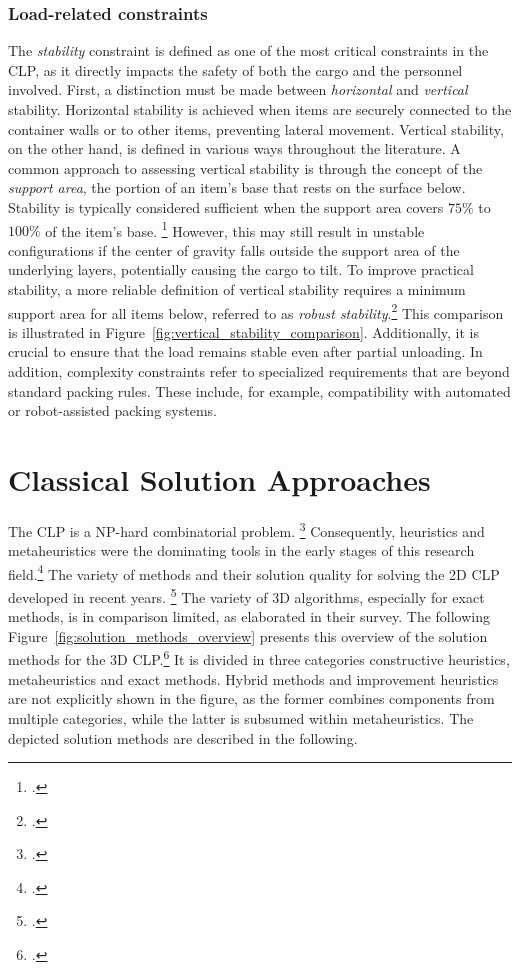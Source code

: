 \subsubsection{Load-related constraints}

The \textit{stability} constraint is defined as one of the most critical constraints
in the \gls{CLP}, as it directly impacts the safety of both the cargo and the personnel involved.
First, a distinction must be made between \textit{horizontal} and \textit{vertical} stability.
Horizontal stability is achieved when items are securely connected to the
container walls or to other items, preventing lateral movement. Vertical
stability, on the other hand, is defined in various ways throughout the
literature. A common approach to assessing vertical stability is through the concept of the \textit{support
    area}, the portion of an item's base that rests on the surface below. Stability is typically
considered sufficient when the support area covers $75\%$ to $100\%$ of the item’s base. \footcite[cf.][p. 344]{gendreau_tabu_2006} However,
this may still result in unstable configurations if the center of gravity falls outside the
support area of the underlying layers, potentially causing the cargo to tilt. To improve practical stability,
a more reliable definition of vertical stability requires a minimum support area for all items below,
referred to as \textit{robust stability}.\footcite[cf.][p. 1140]{ceschia_local_2013} This comparison is illustrated in Figure~\ref{fig:vertical_stability_comparison}.
Additionally, it is crucial to ensure that the load remains stable even after partial unloading.
In addition, complexity constraints refer to specialized
requirements that are beyond standard packing rules. These include, for example, compatibility with automated or robot-assisted packing systems.




\section{Classical Solution Approaches}
\label{sec:classical_solution_approaches}
The \gls{CLP} is a NP-hard combinatorial problem. \footcite[cf.][p. 11]{bortfeldt_constraints_2013}
Consequently, heuristics and metaheuristics were the dominating tools
in the early stages of this research field.\footcite[cf.][]{pisinger_heuristics_2002} The variety of methods
and their solution quality for solving the 2D \gls{CLP} developed in recent years. \footcite[cf.][p. 23]{iori_exact_2021}
The variety of 3D algorithms, especially for exact methods, is in comparison limited, as
\textcite{zhao_comparative_2016} elaborated in their survey. The following Figure~\ref{fig:solution_methods_overview}
presents this overview of the solution methods for the 3D \gls{CLP}.\footcite[cf.][]{zhao_comparative_2016}
It is divided in three categories constructive heuristics, metaheuristics
and exact methods. Hybrid methods and improvement heuristics are not explicitly shown in the figure,
as the former combines components from multiple categories, while the latter is subsumed within
metaheuristics. The depicted solution methods are described in the following.

